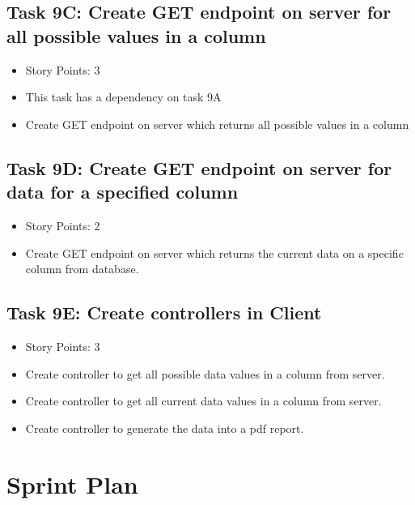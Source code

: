 \documentclass[12pt]{article}
\begin{document}
\subsection{Task 9C: Create GET endpoint on server for all possible values in a column}
\begin{itemize}%
\item Story Points: 3
\item This task has a dependency on task 9A
\item Create GET endpoint on server which returns all possible values in a column
\end{itemize}

\subsection{Task 9D: Create GET endpoint on server for data for a specified column}
\begin{itemize}%
\item Story Points: 2
\item Create GET endpoint on server which returns the current data on a specific column from database.
\end{itemize}

\subsection{Task 9E: Create controllers in Client}
\begin{itemize}%
\item Story Points: 3
\item Create controller to get all possible data values in a column from server.
\item Create controller to get all current data values in a column from server.
\item Create controller to generate the data into a pdf report.
\end{itemize}

\newpage
\section{Sprint Plan}
\end{document}
